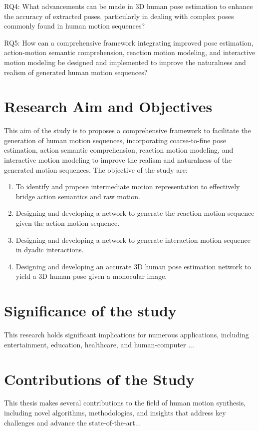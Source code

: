 RQ4: What advancements can be made in 3D human pose estimation to enhance the accuracy of extracted poses, particularly in dealing with complex poses commonly found in human motion sequences?

RQ5: How can a comprehensive framework integrating improved pose estimation, action-motion semantic comprehension, reaction motion modeling, and interactive motion modeling be designed and implemented to improve the naturalness and realism of generated human motion sequences?


\section{Research Aim and Objectives}
This aim of the study is to proposes a comprehensive framework to facilitate the generation of human motion sequences, incorporating coarse-to-fine pose estimation, action semantic comprehension, reaction motion modeling, and interactive motion modeling to improve the realism and naturalness of the generated motion sequences. The objective of the study are:

\begin{enumerate}
	\item To identify and propose intermediate motion representation to effectively bridge action semantics and raw motion.
	\item Designing and developing a network to generate the reaction motion sequence given the action motion sequence.
	\item Designing and developing a network to generate interaction motion sequence in dyadic interactions.
	\item Designing and developing an accurate 3D human pose estimation network to yield a 3D human pose given a monocular image. 
\end{enumerate}


\section{Significance of the study}
This research holds significant implications for numerous applications, including entertainment, education, healthcare, and human-computer ...



\section{Contributions of the Study}
This thesis makes several contributions to the field of human motion synthesis, including novel algorithms, methodologies, and insights that address key challenges and advance the state-of-the-art...

